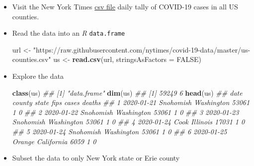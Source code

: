\documentclass[]{book}
\newenvironment{Shaded}{\begin{snugshade}}{\end{snugshade}}
\newcommand{\CommentTok}[1]{\textcolor[rgb]{0.56,0.35,0.01}{\textit{#1}}}
\newcommand{\DataTypeTok}[1]{\textcolor[rgb]{0.13,0.29,0.53}{#1}}
\newcommand{\KeywordTok}[1]{\textcolor[rgb]{0.13,0.29,0.53}{\textbf{#1}}}
\newcommand{\NormalTok}[1]{#1}
\newcommand{\OperatorTok}[1]{\textcolor[rgb]{0.81,0.36,0.00}{\textbf{#1}}}
\newcommand{\OtherTok}[1]{\textcolor[rgb]{0.56,0.35,0.01}{#1}}
\newcommand{\StringTok}[1]{\textcolor[rgb]{0.31,0.60,0.02}{#1}}
\begin{document}
\begin{itemize}
\item
  Visit the New York Times \href{https://raw.githubusercontent.com/nytimes/covid-19-data/master/us-counties.csv}{csv file} daily tally of COVID-19 cases in all US counties.
\item
  Read the data into an \emph{R} \texttt{data.frame}

\begin{Shaded}
\begin{Highlighting}[]
\NormalTok{url <-}
\StringTok{  "https://raw.githubusercontent.com/nytimes/covid-19-data/master/us-counties.csv"}
\NormalTok{us <-}\StringTok{ }\KeywordTok{read.csv}\NormalTok{(url, }\DataTypeTok{stringsAsFactors =} \OtherTok{FALSE}\NormalTok{)}
\end{Highlighting}
\end{Shaded}
\item
  Explore the data

\begin{Shaded}
\begin{Highlighting}[]
\KeywordTok{class}\NormalTok{(us)}
\CommentTok{## [1] "data.frame"}
\KeywordTok{dim}\NormalTok{(us)}
\CommentTok{## [1] 59249     6}
\KeywordTok{head}\NormalTok{(us)}
\CommentTok{##         date    county      state  fips cases deaths}
\CommentTok{## 1 2020-01-21 Snohomish Washington 53061     1      0}
\CommentTok{## 2 2020-01-22 Snohomish Washington 53061     1      0}
\CommentTok{## 3 2020-01-23 Snohomish Washington 53061     1      0}
\CommentTok{## 4 2020-01-24      Cook   Illinois 17031     1      0}
\CommentTok{## 5 2020-01-24 Snohomish Washington 53061     1      0}
\CommentTok{## 6 2020-01-25    Orange California  6059     1      0}
\end{Highlighting}
\end{Shaded}
\item
  Subset the data to only New York state or Erie county

\begin{Shaded}
\end{Shaded}
\end{itemize}
\end{document}
